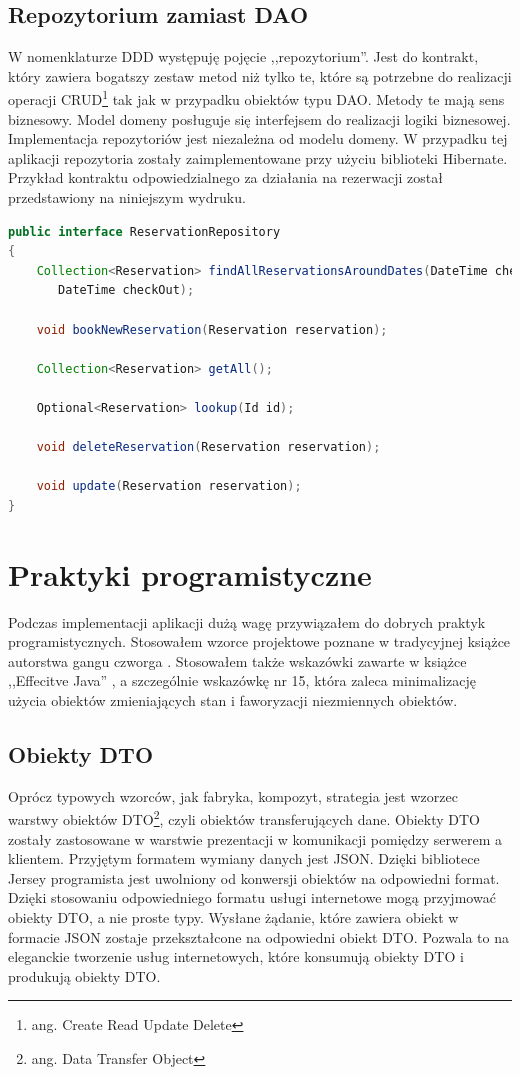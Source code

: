 \documentclass[a4paper,onecolumn,oneside,11pt,wide,floatssmall]{mwrep}
\theoremstyle{definition}
\theoremstyle{plain}%
\theoremstyle{remark}
\begin{document}
\subsection{Repozytorium zamiast DAO}
W nomenklaturze DDD występuję pojęcie ,,repozytorium''. Jest do kontrakt, który zawiera bogatszy zestaw metod niż tylko te, które są potrzebne do realizacji operacji CRUD\footnote{ang. Create Read Update Delete} tak jak w przypadku obiektów typu DAO. Metody te mają sens biznesowy. Model domeny posługuje się interfejsem do realizacji logiki biznesowej. Implementacja repozytoriów jest niezależna od modelu domeny. W przypadku tej aplikacji repozytoria zostały zaimplementowane przy użyciu biblioteki Hibernate. Przykład kontraktu odpowiedzialnego za działania na rezerwacji został przedstawiony na niniejszym wydruku.

\begin{lstlisting}[language=Java,style=outcode,caption=Repozytorium rezerwacji]
public interface ReservationRepository
{
    Collection<Reservation> findAllReservationsAroundDates(DateTime checkIn,
       DateTime checkOut);

    void bookNewReservation(Reservation reservation);

    Collection<Reservation> getAll();

    Optional<Reservation> lookup(Id id);

    void deleteReservation(Reservation reservation);

    void update(Reservation reservation);
}
\end{lstlisting}

\section{Praktyki programistyczne}
Podczas implementacji aplikacji dużą wagę przywiązałem do dobrych praktyk programistycznych. Stosowałem wzorce projektowe poznane w tradycyjnej książce autorstwa gangu czworga \cite{gamma1994design}. Stosowałem także wskazówki zawarte w książce ,,Effecitve Java'' \cite{bloch2008effective}, a szczególnie wskazówkę nr 15, która zaleca minimalizację użycia obiektów zmieniających stan i faworyzacji niezmiennych obiektów.

\subsection{Obiekty DTO}
Oprócz typowych wzorców, jak fabryka, kompozyt, strategia jest wzorzec warstwy obiektów DTO\footnote{ang. Data Transfer Object}, czyli obiektów transferujących dane. Obiekty DTO zostały zastosowane w warstwie prezentacji w komunikacji pomiędzy serwerem a klientem. Przyjętym formatem wymiany danych jest JSON. Dzięki bibliotece Jersey programista jest uwolniony od konwersji obiektów na odpowiedni format. Dzięki stosowaniu odpowiedniego formatu usługi internetowe mogą przyjmować obiekty DTO, a nie proste typy. Wysłane żądanie, które zawiera obiekt w formacie JSON zostaje przekształcone na odpowiedni obiekt DTO. Pozwala to na eleganckie tworzenie usług internetowych, które konsumują obiekty DTO i produkują obiekty DTO.
\end{document}
